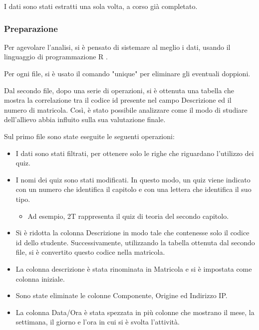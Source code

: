 I dati sono stati estratti una sola volta, a corso già completato.

\subsubsection{Preparazione}

Per agevolare l'analisi, si è pensato di sistemare al meglio i dati, usando il linguaggio di programmazione R \cite{R}.

Per ogni file, si è usato il comando "unique" per eliminare gli eventuali doppioni. 

Dal secondo file, dopo una serie di operazioni, si è ottenuta una tabella che mostra la correlazione tra il codice id presente nel campo Descrizione ed il numero di matricola.
Così, è stato possibile analizzare come il modo di studiare dell'allievo abbia influito sulla sua valutazione finale.

Sul primo file sono state eseguite le seguenti operazioni:
\begin{itemize}
\item I dati sono stati filtrati, per ottenere solo le righe che riguardano l'utilizzo dei quiz.
\item I nomi dei quiz sono stati modificati. In questo modo, un quiz viene indicato con un numero che identifica il capitolo e con una lettera che identifica il suo tipo.
\begin{itemize}
\item Ad esempio, 2T rappresenta il quiz di teoria del secondo capitolo.  
\end{itemize} 
\item Si è ridotta la colonna Descrizione in modo tale che contenesse solo il codice id dello studente. Successivamente, utilizzando la tabella ottenuta dal secondo file, si è convertito questo codice nella matricola.
\item La colonna descrizione è stata rinominata in Matricola e si è impostata come colonna iniziale.
\item Sono state eliminate le colonne Componente, Origine ed Indirizzo IP.
\item La colonna Data/Ora è stata spezzata in più colonne che mostrano il mese, la settimana, il giorno e l'ora in cui si è svolta l'attività.
\end{itemize}

